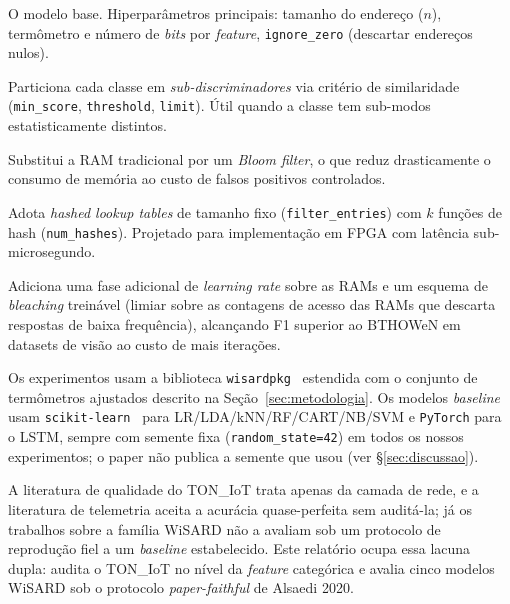 \begin{description}[leftmargin=*,itemsep=0pt]
  \item[\textbf{WiSARD}~\cite{aleksander1984wisard}.] O modelo base.
        Hiperparâmetros principais: tamanho do endereço ($n$),
        termômetro e número de \emph{bits} por \emph{feature},
        \texttt{ignore\_zero} (descartar endereços nulos).
  \item[\textbf{ClusWiSARD}~\cite{cardoso2016cluswisard}.] Particiona
        cada classe em \emph{sub-discriminadores} via critério de
        similaridade (\texttt{min\_score}, \texttt{threshold},
        \texttt{limit}). Útil quando a classe tem sub-modos
        estatisticamente distintos.
  \item[\textbf{BloomWiSARD}~\cite{santiago2020bloomwisard}.]
        Substitui a RAM tradicional por um \emph{Bloom filter}, o que
        reduz drasticamente o consumo de memória ao custo de falsos
        positivos controlados.
  \item[\textbf{BTHOWeN}~\cite{susskind2022bthowen}.] Adota
        \emph{hashed lookup tables} de tamanho fixo
        (\texttt{filter\_entries}) com $k$ funções de hash
        (\texttt{num\_hashes}). Projetado para implementação em FPGA
        com latência sub-microsegundo.
  \item[\textbf{ULEEN}~\cite{susskind2023uleen}.] Adiciona uma fase
        adicional de \emph{learning rate} sobre as RAMs e um esquema
        de \emph{bleaching} treinável (limiar sobre as contagens de
        acesso das RAMs que descarta respostas de baixa frequência),
        alcançando F1 superior ao BTHOWeN em datasets de visão ao
        custo de mais iterações.
\end{description}

Os experimentos usam a biblioteca \texttt{wisardpkg}~\cite{wisardpkg}
estendida com o conjunto de termômetros ajustados descrito na
Seção~\ref{sec:metodologia}. Os modelos \emph{baseline} usam
\texttt{scikit-learn}~\cite{scikit-learn} para LR/LDA/kNN/RF/CART/NB/SVM
e \texttt{PyTorch} para o LSTM, sempre com semente fixa
(\texttt{random\_state=42}) em todos os nossos experimentos; o paper
não publica a semente que usou (ver \S{}\ref{sec:discussao}).

\medskip
\noindent A literatura de qualidade do TON\_IoT trata apenas da camada
de rede, e a literatura de telemetria aceita a acurácia quase-perfeita
sem auditá-la; já os trabalhos sobre a família WiSARD não a avaliam sob
um protocolo de reprodução fiel a um \emph{baseline} estabelecido. Este
relatório ocupa essa lacuna dupla: audita o TON\_IoT no nível da
\emph{feature} categórica e avalia cinco modelos WiSARD sob o protocolo
\emph{paper-faithful} de Alsaedi 2020.

